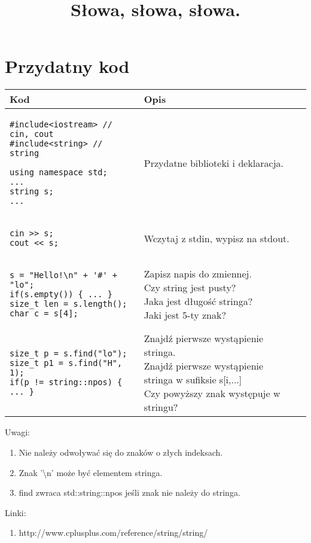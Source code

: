 \documentclass{article}
\theoremstyle{break}
\begin{document}
\title{Słowa, słowa, słowa.}

\maketitle

\section{Przydatny kod}
\begin{tabular}{ | l | l | m{3cm} | }
\hline
Kod & Opis \\
\hline
\begin{lstlisting}
#include<iostream> // cin, cout
#include<string> // string

using namespace std;
...
string s;
...
\end{lstlisting} & Przydatne biblioteki i deklaracja. \\
\hline
\begin{lstlisting}
cin >> s;
cout << s;
\end{lstlisting} & 
Wczytaj z stdin, wypisz na stdout. \\
\hline
\begin{lstlisting}
s = "Hello!\n" + '#' + "lo";
if(s.empty()) { ... }
size_t len = s.length();
char c = s[4];
\end{lstlisting} &  \shortstack[l]{
Zapisz napis do zmiennej. \\
Czy string jest pusty? \\
Jaka jest długość stringa? \\
Jaki jest 5-ty znak? } \\
\hline
\begin{lstlisting}
size_t p = s.find("lo");
size_t p1 = s.find("H", 1);
if(p != string::npos) { ... }
\end{lstlisting} &
\shortstack[l]{
Znajdź pierwsze wystąpienie stringa. \\
Znajdź pierwsze wystąpienie stringa w sufiksie s[i,...] \\
Czy powyższy znak występuje w stringu? } \\
\hline
\end{tabular}

Uwagi:
\begin{enumerate}
\item Nie należy odwoływać się do znaków o złych indeksach.
\item Znak '\textbackslash n' może być elementem stringa.
\item find zwraca std::string::npos jeśli znak nie należy do stringa.
\end{enumerate}
Linki:
\begin{enumerate}
\item http://www.cplusplus.com/reference/string/string/
\end{enumerate}
\end{document}
